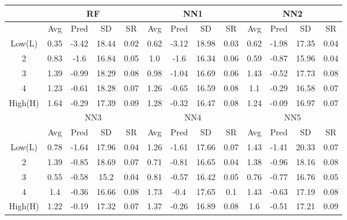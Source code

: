 \begin{tabular}{ccccccccccccc}
 & \multicolumn{4}{c}{RF} & \multicolumn{4}{c}{NN1} & \multicolumn{4}{c}{NN2}\\
\hline
& Avg & Pred & SD & SR & Avg & Pred & SD & SR & Avg & Pred & SD & SR \\
\hline
Low(L)& 0.35& -3.42& 18.44& 0.02& 0.62& -3.12& 18.98& 0.03& 0.62& -1.98& 17.35& 0.04\\
2& 0.83& -1.6& 16.84& 0.05& 1.0& -1.6& 16.34& 0.06& 0.59& -0.87& 15.96& 0.04\\
3& 1.39& -0.99& 18.29& 0.08& 0.98& -1.04& 16.69& 0.06& 1.43& -0.52& 17.73& 0.08\\
4& 1.23& -0.61& 18.28& 0.07& 1.26& -0.65& 16.59& 0.08& 1.1& -0.29& 16.58& 0.07\\
High(H)& 1.64& -0.29& 17.39& 0.09& 1.28& -0.32& 16.47& 0.08& 1.24& -0.09& 16.97& 0.07\\
\hline
 & \multicolumn{4}{c}{NN3} & \multicolumn{4}{c}{NN4} & \multicolumn{4}{c}{NN5}\\
\hline
& Avg & Pred & SD & SR & Avg & Pred & SD & SR & Avg & Pred & SD & SR \\
\hline
Low(L)& 0.78& -1.64& 17.96& 0.04& 1.26& -1.61& 17.66& 0.07& 1.43& -1.41& 20.33& 0.07\\
2& 1.39& -0.85& 18.69& 0.07& 0.71& -0.81& 16.65& 0.04& 1.38& -0.96& 18.16& 0.08\\
3& 0.55& -0.58& 15.2& 0.04& 0.81& -0.57& 16.42& 0.05& 0.76& -0.77& 16.76& 0.05\\
4& 1.4& -0.36& 16.66& 0.08& 1.73& -0.4& 17.65& 0.1& 1.43& -0.63& 17.19& 0.08\\
High(H)& 1.22& -0.19& 17.32& 0.07& 1.37& -0.26& 16.89& 0.08& 1.6& -0.51& 17.21& 0.09\\
\hline
\end{tabular}